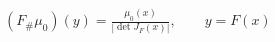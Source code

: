 \documentclass[border=2pt,12pt]{standalone}
\begin{document}
$\displaystyle (F_{\#}\mu_0)(y) = \frac{\mu_0(x)}{|\det J_F(x)|}, \qquad y = F(x)$
\end{document}
